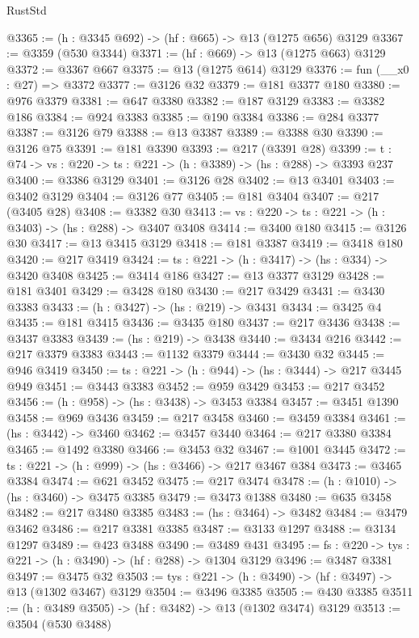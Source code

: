 \begin{lexlean}{RustStd}
\begin{coremodule}
@3365 := (h : @3345 @692) -> (hf : @665) -> @13 (@1275 @656) @3129
@3367 := @3359 (@530 @3344)
@3371 := (hf : @669) -> @13 (@1275 @663) @3129
@3372 := @3367 @667
@3375 := @13 (@1275 @614) @3129
@3376 := fun (__x0 : @27) => @3372
@3377 := @3126 @32
@3379 := @181 @3377 @180
@3380 := @976 @3379
@3381 := @647 @3380
@3382 := @187 @3129
@3383 := @3382 @186
@3384 := @924 @3383
@3385 := @190 @3384
@3386 := @284 @3377
@3387 := @3126 @79
@3388 := @13 @3387
@3389 := @3388 @30
@3390 := @3126 @75
@3391 := @181 @3390
@3393 := @217 (@3391 @28)
@3399 := {t : @74} -> {vs : @220} -> {ts : @221} -> (h : @3389) -> (hs : @288) -> @3393 @237
@3400 := @3386 @3129
@3401 := @3126 @28
@3402 := @13 @3401
@3403 := @3402 @3129
@3404 := @3126 @77
@3405 := @181 @3404
@3407 := @217 (@3405 @28)
@3408 := @3382 @30
@3413 := {vs : @220} -> {ts : @221} -> (h : @3403) -> (hs : @288) -> @3407 @3408
@3414 := @3400 @180
@3415 := @3126 @30
@3417 := @13 @3415 @3129
@3418 := @181 @3387
@3419 := @3418 @180
@3420 := @217 @3419
@3424 := {ts : @221} -> (h : @3417) -> (hs : @334) -> @3420 @3408
@3425 := @3414 @186
@3427 := @13 @3377 @3129
@3428 := @181 @3401
@3429 := @3428 @180
@3430 := @217 @3429
@3431 := @3430 @3383
@3433 := (h : @3427) -> (hs : @219) -> @3431
@3434 := @3425 @4
@3435 := @181 @3415
@3436 := @3435 @180
@3437 := @217 @3436
@3438 := @3437 @3383
@3439 := (hs : @219) -> @3438
@3440 := @3434 @216
@3442 := @217 @3379 @3383
@3443 := @1132 @3379
@3444 := @3430 @32
@3445 := @946 @3419
@3450 := {ts : @221} -> (h : @944) -> (hs : @3444) -> @217 @3445 @949
@3451 := @3443 @3383
@3452 := @959 @3429
@3453 := @217 @3452
@3456 := (h : @958) -> (hs : @3438) -> @3453 @3384
@3457 := @3451 @1390
@3458 := @969 @3436
@3459 := @217 @3458
@3460 := @3459 @3384
@3461 := (hs : @3442) -> @3460
@3462 := @3457 @3440
@3464 := @217 @3380 @3384
@3465 := @1492 @3380
@3466 := @3453 @32
@3467 := @1001 @3445
@3472 := {ts : @221} -> (h : @999) -> (hs : @3466) -> @217 @3467 @384
@3473 := @3465 @3384
@3474 := @621 @3452
@3475 := @217 @3474
@3478 := (h : @1010) -> (hs : @3460) -> @3475 @3385
@3479 := @3473 @1388
@3480 := @635 @3458
@3482 := @217 @3480 @3385
@3483 := (hs : @3464) -> @3482
@3484 := @3479 @3462
@3486 := @217 @3381 @3385
@3487 := @3133 @1297
@3488 := @3134 @1297
@3489 := @423 @3488
@3490 := @3489 @431
@3495 := {fs : @220} -> {tys : @221} -> (h : @3490) -> (hf : @288) -> @1304 @3129
@3496 := @3487 @3381
@3497 := @3475 @32
@3503 := {tys : @221} -> (h : @3490) -> (hf : @3497) -> @13 (@1302 @3467) @3129
@3504 := @3496 @3385
@3505 := @430 @3385
@3511 := (h : @3489 @3505) -> (hf : @3482) -> @13 (@1302 @3474) @3129
@3513 := @3504 (@530 @3488)

\end{coremodule}
\end{lexlean}
